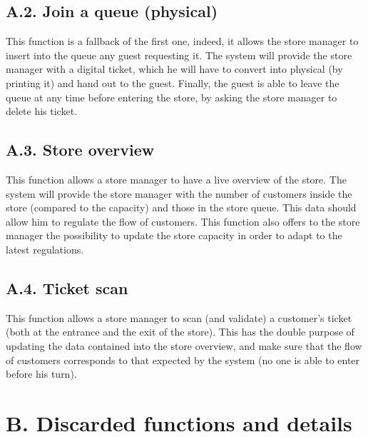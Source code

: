 \subsection{A.2. Join a queue (physical)}

This function is a fallback of the first one, indeed, it allows the store manager to insert into the queue any guest requesting it.
The system will provide the store manager with a digital ticket, which he will have to convert into physical (by printing it) and hand out to the guest.
Finally, the guest is able to leave the queue at any time before entering the store, by asking the store manager to delete his ticket.

\subsection{A.3. Store overview}

This function allows a store manager to have a live overview of the store.
The system will provide the store manager with the number of customers inside the store (compared to the capacity) and those in the store queue.
This data should allow him to regulate the flow of customers.
This function also offers to the store manager the possibility to update the store capacity in order to adapt to the latest regulations.

\subsection{A.4. Ticket scan}

This function allows a store manager to scan (and validate) a customer’s ticket (both at the entrance and the exit of the store).
This has the double purpose of updating the data contained into the store overview, and make sure that the flow of customers corresponds to that expected by the system (no one is able to enter before his turn).

\section{B. Discarded functions and details}

